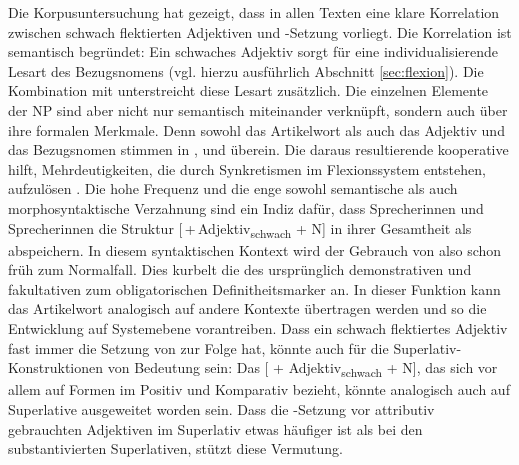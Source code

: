 Die Korpusuntersuchung  hat gezeigt, dass in allen Texten eine klare Korrelation zwischen schwach flektierten Adjektiven  und -Setzung vorliegt. Die Korrelation ist semantisch begründet: Ein schwaches  Adjektiv  sorgt für eine individualisierende Lesart des Bezugsnomens (vgl. hierzu ausführlich Abschnitt \ref{sec:flexion}). Die Kombination mit  unterstreicht diese Lesart zusätzlich.  Die einzelnen Elemente der  NP sind aber nicht nur semantisch miteinander verknüpft, sondern auch über ihre formalen Merkmale. Denn sowohl das Artikelwort als auch das Adjektiv  und das Bezugsnomen stimmen in ,  und  überein. Die daraus resultierende kooperative   hilft, Mehrdeutigkeiten, die durch Synkretismen im Flexionssystem  entstehen, aufzulösen \parencite[127]{Szczepaniak2010}. Die hohe Frequenz und die enge sowohl semantische als auch morphosyntaktische Verzahnung sind ein Indiz dafür, dass Sprecherinnen und Sprecherinnen die Struktur  [\,+\,Adjektiv\textsubscript{schwach} + N] in ihrer Gesamtheit als  abspeichern. In diesem syntaktischen Kontext wird der Gebrauch von  also schon früh zum Normalfall. Dies  kurbelt die  des ursprünglich demonstrativen und fakultativen  zum obligatorischen Definitheitsmarker an. In dieser Funktion kann das Artikelwort analogisch  auf andere Kontexte übertragen werden und so die Entwicklung auf Systemebene vorantreiben. Dass ein schwach flektiertes  Adjektiv  fast immer die Setzung von  zur Folge hat, könnte auch für die Superlativ-Konstruktionen von Bedeutung sein: Das  [ + Adjektiv\textsubscript{schwach} + N], das sich vor allem auf Formen im Positiv und Komparativ bezieht, könnte analogisch  auch auf Superlative ausgeweitet worden sein. Dass die -Setzung vor attributiv gebrauchten Adjektiven  im Superlativ etwas häufiger ist als bei den substantivierten  Superlativen,  stützt diese Vermutung. 

